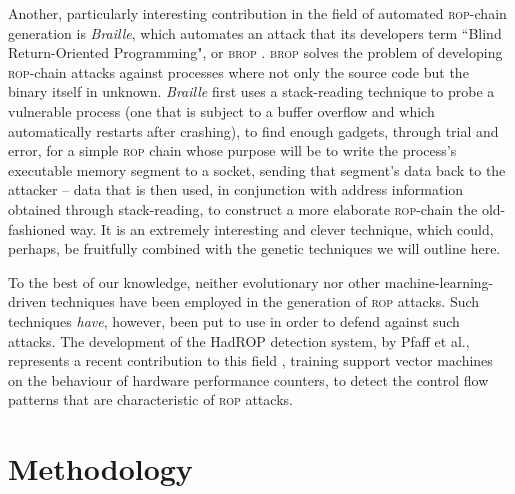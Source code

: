 Another, particularly interesting contribution in the field of
automated \textsc{rop}-chain generation is \emph{Braille}, which
automates an attack that its developers term ``Blind
Return-Oriented Programming", or \textsc{brop} \cite{bittau14}.
\textsc{brop} solves the problem of developing \textsc{rop}-chain
attacks against processes where not only the source code but the
binary itself in unknown. %
\emph{Braille} first uses a stack-reading technique to probe a
vulnerable process (one that is subject to a buffer overflow and
which automatically restarts after crashing), to find enough
gadgets, through trial and error, for a simple \textsc{rop} chain
whose purpose will be to write the process's executable memory
segment to a socket, sending that segment's data back to the
attacker -- data that is then used, in conjunction with address
information obtained through stack-reading, to construct a more
elaborate \textsc{rop}-chain the old-fashioned way. It is an
extremely interesting and clever technique, which could, perhaps,
be fruitfully combined with the genetic techniques we will
outline here. 

To the best of our knowledge, neither evolutionary nor other
machine-learning-driven techniques have been employed in the
generation of \textsc{rop} attacks. Such techniques \emph{have},
however, been put to use in order to defend against such attacks.
The development of the HadROP detection system, by Pfaff et
al., represents a recent contribution to this field \cite{pfaff15}, training support
vector machines on the behaviour of hardware performance
counters, to detect the control flow patterns that are
characteristic of \textsc{rop} attacks.  

\section{Methodology}\label{sec:methodology}

